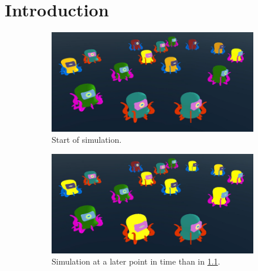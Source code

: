 \chapter{Introduction}
\label{chap:introduction}
	
\begin{figure}[ht!]
  \begin{subfigure}[b]{0.5\textwidth}
	\centering\captionsetup{width=.9\linewidth}%
	\includegraphics[width=\textwidth]{Assets/DocSegments/Chapters/Introduction/Figures/illustrative_system_result_figure_t1.png}
	\caption{Start of simulation. }
	\label{fig:sub:illustrative_developed_system_t1}
  \end{subfigure}
  \begin{subfigure}[b]{0.5\textwidth}
	\centering\captionsetup{width=.9\linewidth}%
	\includegraphics[width=\textwidth]{Assets/DocSegments/Chapters/Introduction/Figures/illustrative_system_result_figure_t2.png}
	\caption{Simulation at a later point in time than in \ref{fig:sub:illustrative_developed_system_t1}.}
	\label{fig:sub:illustrative_developed_system_t2}
  \end{subfigure}
  \begin{subfigure}[b]{0.5\textwidth}
	\centering\captionsetup{width=.9\linewidth}%

\end{subfigure}
\end{figure}
